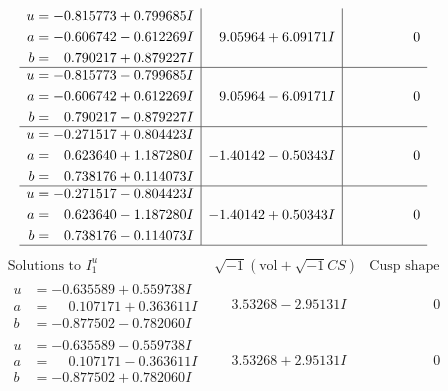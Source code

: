 \documentclass[1p]{elsarticle_modified}
\theoremstyle{definition}
\newcommand{\I}{\sqrt{-1}}
\begin{document}
$$\begin{array}{c|c|c}
\begin{aligned}
u &= -0.815773 + 0.799685 I \\
a &= -0.606742 - 0.612269 I \\
b &= \phantom{-}0.790217 + 0.879227 I\end{aligned}
 & \phantom{-}9.05964 + 6.09171 I & \phantom{-0.000000 } 0 \\ \hline\begin{aligned}
u &= -0.815773 - 0.799685 I \\
a &= -0.606742 + 0.612269 I \\
b &= \phantom{-}0.790217 - 0.879227 I\end{aligned}
 & \phantom{-}9.05964 - 6.09171 I & \phantom{-0.000000 } 0 \\ \hline\begin{aligned}
u &= -0.271517 + 0.804423 I \\
a &= \phantom{-}0.623640 + 1.187280 I \\
b &= \phantom{-}0.738176 + 0.114073 I\end{aligned}
 & -1.40142 - 0.50343 I & \phantom{-0.000000 } 0 \\ \hline\begin{aligned}
u &= -0.271517 - 0.804423 I \\
a &= \phantom{-}0.623640 - 1.187280 I \\
b &= \phantom{-}0.738176 - 0.114073 I\end{aligned}
 & -1.40142 + 0.50343 I & \phantom{-0.000000 } 0\\
 \hline 
 \end{array}$$\newpage$$\begin{array}{c|c|c}  
\text{Solutions to }I^u_{1}& \I (\text{vol} + \sqrt{-1}CS) & \text{Cusp shape}\\
 \hline 
\begin{aligned}
u &= -0.635589 + 0.559738 I \\
a &= \phantom{-}0.107171 + 0.363611 I \\
b &= -0.877502 - 0.782060 I\end{aligned}
 & \phantom{-}3.53268 - 2.95131 I & \phantom{-0.000000 } 0 \\ \hline\begin{aligned}
u &= -0.635589 - 0.559738 I \\
a &= \phantom{-}0.107171 - 0.363611 I \\
b &= -0.877502 + 0.782060 I\end{aligned}
 & \phantom{-}3.53268 + 2.95131 I & \phantom{-0.000000 } 0 \\ \hline\begin{aligned}

\end{aligned}
\end{array}$$
\end{document}

